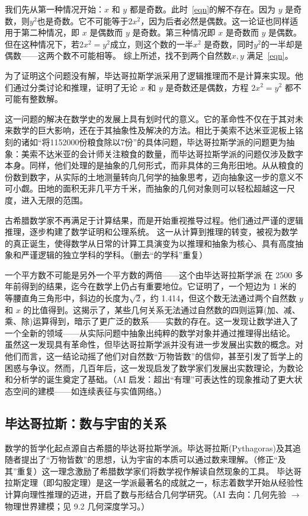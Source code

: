 我们先从第一种情况开始：$x$ 和 $y$ 都是奇数。此时~\eqref{eqn}的解不存在。因为 $y$ 是奇数，则$y^2$也是奇数。它不可能等于$2x^2$，因为后者必然是偶数。这一论证也同样适用于第二种情况，即 $x$ 是偶数而 $y$ 是奇数。第三种情况即 $x$ 是奇数而 $y$ 是偶数。但在这种情况下，若$2x^2=y^2$成立，则这个数的一半$x^2$ 是奇数，同时$y^2$的一半却是偶数——这两个数不可能相等。
综上所述，找不到两个自然数$x,y$ 满足~\eqref{eqn}。

为了证明这个问题没有解，毕达哥拉斯学派采用了逻辑推理而不是计算来实现。他们通过分类讨论和推理，证明了无论 $x$ 和 $y$ 是奇数还是偶数，方程 $2x^2 = y^2$ 都不可能有整数解。

这一问题的解决在数学史的发展上具有划时代的意义。它的革命性不仅在于其对未来数学的巨大影响，还在于其抽象性及解决的方法。相比于美索不达米亚泥板上铭刻的诸如“将1152000份粮食除以7份”的具体问题，毕达哥拉斯学派的问题更为抽象：美索不达米亚的会计师关注粮食的数量，而毕达哥拉斯学派的问题仅涉及数字本身。同样，他们处理的是抽象的几何形式，而非具体的三角形田地。从从粮食的份数到数字，从实际的土地测量转向几何学的抽象思考，迈向抽象这一步的意义不可小觑。田地的面积无非几平方千米，而抽象的几何对象则可以轻松超越这一尺度，进入无限的范围。

古希腊数学家不再满足于计算结果，而是开始重视推导过程。他们通过严谨的逻辑推理，逐步构建了数学证明和公理系统。
这一从计算到推理的转变，被视为数学的真正诞生，使得数学从日常的计算工具演变为以推理和抽象为核心、具有高度抽象和严谨逻辑的独立学科的学科。{（删去“的学科”重复）}

一个平方数不可能是另外一个平方数的两倍——这个由毕达哥拉斯学派 在 2500 多年前得到的结果，迄今在数学上仍占有重要地位。它证明了，一个短边为 1 米的等腰直角三角形中，斜边的长度为$\sqrt{2}$，约 1.414，但这个数无法通过两个自然数 $y$ 和 $x$ 的比值得到。这揭示了，某些几何关系无法通过自然数的四则运算(加、减、乘、除)运算得到，暗示了更广泛的数系——实数的存在。这一发现让数学进入了一个全新的领域——从实际问题中抽象出纯粹的数学对象并通过推理得出结论。
虽然这一发现具有革命性，但毕达哥拉斯学派并没有进一步发展出实数的概念。对他们而言，这一结论动摇了他们对自然数“万物皆数”的信仰，甚至引发了哲学上的困惑与争议。然而，几百年后，这一发现启发了数学家们发展出实数理论，为数论和分析学的诞生奠定了基础。{（AI 启发：超出“有理”可表达性的现象推动了更大状态空间的建模——如连续表征与实值网络。）}

\subsection{毕达哥拉斯：数与宇宙的关系}
数学的哲学化起点源自古希腊的毕达哥拉斯学派。毕达哥拉斯(Pythagoras){及其}追随者提出了“万物皆数”的思想，认为宇宙的本质可以通过数来理解。{（修正“及其”重复）}这一理念激励了希腊数学家们将数学视作解读自然现象的工具。
毕达哥拉斯定理（即勾股定理）是这一学派最著名的成就之一，标志着数学开始从经验性计算向理性推理的迈进，开启了数与形结合几何学研究。{（AI 去向：几何先验 $\rightarrow$ 物理世界建模；见 9.2 几何深度学习。）}

